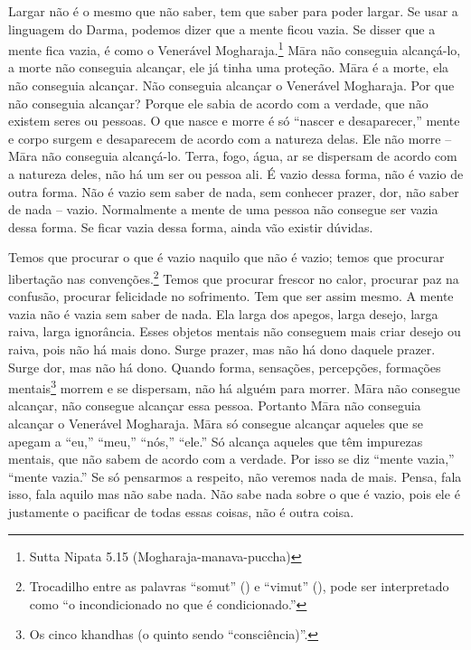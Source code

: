 Largar não é o mesmo que não saber, tem que saber para poder largar.
Se usar a linguagem do Darma, podemos dizer que a mente ficou vazia. Se
disser que a mente fica vazia, é como o Venerável
Mogharaja.\footnote{Sutta Nipata 5.15 (Mogharaja-manava-puccha)} Māra
não conseguia alcançá-lo, a morte não conseguia alcançar, ele já tinha
uma proteção. Māra é a morte, ela não conseguia alcançar. Não
conseguia alcançar o Venerável Mogharaja. Por que não conseguia
alcançar? Porque ele sabia de acordo com a verdade, que não existem
seres ou pessoas. O que nasce e morre é só “nascer e desaparecer,”
mente e corpo surgem e desaparecem de acordo com a natureza delas. Ele
não morre – Māra não conseguia alcançá-lo. Terra, fogo, água, ar se
dispersam de acordo com a natureza deles, não há um ser ou pessoa ali.
É vazio dessa forma, não é vazio de outra forma. Não é vazio sem saber
de nada, sem conhecer prazer, dor, não saber de nada – vazio.
Normalmente a mente de uma pessoa não consegue ser vazia dessa forma.
Se ficar vazia dessa forma, ainda vão existir dúvidas. 

Temos que procurar o que é vazio naquilo que não é vazio; temos que
procurar libertação nas convenções.\footnote{Trocadilho entre as
palavras “somut” () e “vimut”
(), pode ser interpretado como “o
incondicionado no que é condicionado.”} Temos que procurar frescor no
calor, procurar paz na confusão, procurar felicidade no sofrimento. Tem
que ser assim mesmo. A mente vazia não é vazia sem saber de nada. Ela
larga dos apegos, larga desejo, larga raiva, larga ignorância. Esses
objetos mentais não conseguem mais criar desejo ou raiva, pois não há
mais dono. Surge prazer, mas não há dono daquele prazer. Surge dor, mas
não há dono. Quando forma, sensações, percepções, formações
mentais\footnote{Os cinco khandhas (o quinto sendo “consciência)”.}
morrem e se dispersam, não há alguém para morrer. Māra não consegue
alcançar, não consegue alcançar essa pessoa. Portanto Māra não
conseguia alcançar o Venerável Mogharaja. Māra só consegue alcançar
aqueles que se apegam a “eu,” “meu,” “nós,” “ele.” Só alcança aqueles
que têm impurezas mentais, que não sabem de acordo com a verdade. Por
isso se diz “mente vazia,” “mente vazia.” Se só pensarmos a respeito,
não veremos nada de mais. Pensa, fala isso, fala aquilo mas não sabe
nada. Não sabe nada sobre o que é vazio, pois ele é justamente o
pacificar de todas essas coisas, não é outra coisa. 

